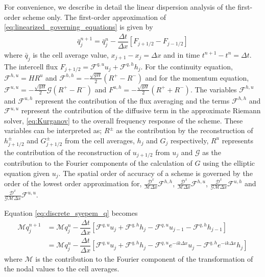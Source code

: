 \documentclass[preprint,sort&compress,1p]{article}
\begin{document}
For convenience, we describe in detail the linear dispersion analysis of the first-order scheme only.  The first-order approximation of  \eqref{eq:linearized_governing_equations} is given by
\begin{align}
\label{eq:discrete_syepem_q}
\bar{q}_j^{n+1} = \bar{q}_j^n - \dfrac{\Delta t}{\Delta x} \left[F_{j+1/2} - F_{j-1/2} \right]
\end{align}
where $\bar{q}_j$ is the cell average value, $x_{j+1} - x_j = \Delta x$ and in time $t^{n+1} - t^n = \Delta t$. The intercell flux $F_{j+1/2} = \mathcal{F}^{q,u} u_j + \mathcal{F}^{q,h} h_j$. For the continuity equation, $\mathcal{F}^{h,u} = HR^u$ and $\mathcal F^{h,h} = -\frac{\sqrt{gH}}{2}(R^+ - R^-)$ and for the momentum equation, $\mathcal F^{u,u} =  -\frac{\sqrt{gH}}{2}\mathcal{G}(R^+ - R^-)$ and $F^{u,h} = -\frac{\sqrt{gH}}{2}(R^+ + R^-)$. The variables $\mathcal{F}^{h,u}$ and $\mathcal{F}^{u,h}$ represent the contribution of the flux averaging and the terms $\mathcal{F}^{h,h}$ and $\mathcal{F}^{u,u}$ represent the contribution of the diffusive term in the approximate Riemann solver, \eqref{eq:Kurganov} to the overall frequency response of the scheme. These variables can be interpreted as;  $R^\pm$ as the contribution by the reconstruction of $h_{j+1/2}^\pm$ and $G_{j+1/2}^\pm$ from the cell averages, $h_j$ and $G_j$ respectively, $R^u$ represents the contribution of the reconstruction of $u_{j+1/2}$ from $u_j$ and $\mathcal{G}$ as the contribution to the Fourier components of the calculation of $G$ using the elliptic equation given $u_j$.  The spatial order of accuracy of a scheme is governed by the order of the lowest order approximation for, $\frac{\mathcal{D}^x}{\mathcal{M}\Delta x}\mathcal{F}^{h,h}$, $\frac{\mathcal{D}^x}{\mathcal{M}\Delta x}\mathcal{F}^{h,u}$, $\frac{\mathcal{D}^x}{\mathcal{G}\mathcal{M}\Delta x}\mathcal{F}^{u,h}$ and $\frac{\mathcal{D}^x}{\mathcal{G}\mathcal{M}\Delta x}\mathcal{F}^{u,u}$.

Equation \eqref{eq:discrete_syepem_q} becomes
\begin{subequations}
\begin{align}
\mathcal{M}q_j^{n+1} &= \mathcal{M}q_j^n - \dfrac{\Delta t}{\Delta x} \left[\mathcal{F}^{q,u}u_j + \mathcal{F}^{q,h}h_j - \mathcal{F}^{q,u}u_{j-1} - \mathcal{F}^{q,h}h_{j-1} \right] \\
&= \mathcal{M}q_j^{n} - \dfrac{\Delta t}{\Delta x} \left[\mathcal{F}^{q,u}u_{j} + \mathcal{F}^{q,h}h_{j} - \mathcal{F}^{q,u}e^{-ik\Delta x}u_j - \mathcal{F}^{q,h}e^{-ik\Delta x}h_j \right]
\end{align}
\end{subequations}
where $\mathcal{M}$ is the contribution to the Fourier component of the transformation of the nodal values to the cell averages.
\end{document}
